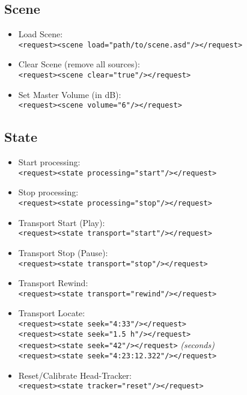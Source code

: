 
%

\subsection{Scene}

\begin{itemize}
  \item Load Scene:\\
    \verb|<request><scene load="path/to/scene.asd"/></request>|
  \item Clear Scene (remove all sources):\\
    \verb|<request><scene clear="true"/></request>|
  \item Set Master Volume (in dB):\\
    \verb|<request><scene volume="6"/></request>|
\end{itemize}

\subsection{State}

\begin{itemize}
  \item Start processing:\\
    \verb|<request><state processing="start"/></request>|

  \item Stop processing:\\
    \verb|<request><state processing="stop"/></request>|

  \item Transport Start (Play):\\
    \verb|<request><state transport="start"/></request>|

  \item Transport Stop (Pause):\\
    \verb|<request><state transport="stop"/></request>|

  \item Transport Rewind:\\
    \verb|<request><state transport="rewind"/></request>|

  \item Transport Locate:\\
    \verb|<request><state seek="4:33"/></request>|\\
    \verb|<request><state seek="1.5 h"/></request>|\\
    \verb|<request><state seek="42"/></request>| \emph{(seconds)}\\
    \verb|<request><state seek="4:23:12.322"/></request>|
  \item Reset/Calibrate Head-Tracker:\\
    \verb|<request><state tracker="reset"/></request>|
\end{itemize}

